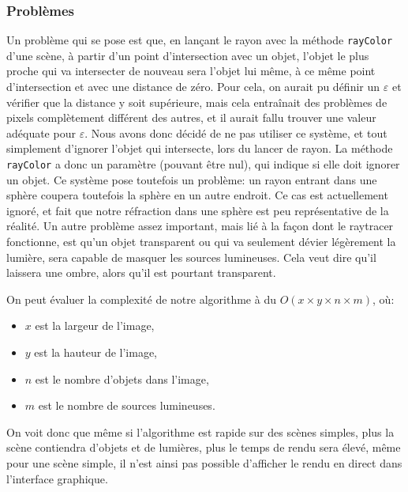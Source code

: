 \documentclass[a4paper]{article}
\begin{document}
    \subsubsection{Problèmes}
    Un problème qui se pose est que, en lançant le rayon avec la méthode \verb+rayColor+ d'une scène,
    à partir d'un point d'intersection avec un objet, l'objet le plus proche qui va intersecter de nouveau
    sera l'objet lui même, à ce même point d'intersection et avec une distance de zéro.
    Pour cela, on aurait pu définir un $\varepsilon$ et vérifier que la distance y soit supérieure, mais
    cela entraînait des problèmes de pixels complètement différent des autres, et il aurait fallu trouver
    une valeur adéquate pour $\varepsilon$. Nous avons donc décidé de ne pas utiliser ce système, et tout
    simplement d'ignorer l'objet qui intersecte, lors du lancer de rayon.
    La méthode \verb+rayColor+ a donc un paramètre (pouvant être nul), qui indique si elle doit ignorer un objet.
    Ce système pose toutefois un problème: un rayon entrant dans une sphère coupera toutefois la sphère en un autre
    endroit. Ce cas est actuellement ignoré, et fait que notre réfraction dans une sphère est peu représentative de la réalité.
    Un autre problème assez important, mais lié à la façon dont le raytracer fonctionne, est qu'un objet transparent ou qui va seulement
    dévier légèrement la lumière, sera capable de masquer les sources lumineuses.
    Cela veut dire qu'il laissera une ombre, alors qu'il est pourtant transparent.

    On peut évaluer la complexité de notre algorithme à du
    $O(x\times y\times n\times m)$, où:
    \begin{itemize}
        \item $x$ est la largeur de l'image,
        \item $y$ est la hauteur de l'image,
        \item $n$ est le nombre d'objets dans l'image,
        \item $m$ est le nombre de sources lumineuses.
    \end{itemize}
    On voit donc que même si l'algorithme est rapide sur des scènes simples,
    plus la scène contiendra d'objets et de lumières, plus le temps de rendu
    sera élevé, même pour une scène simple, il n'est ainsi pas possible
    d'afficher le rendu en direct dans l'interface graphique.
\end{document}
